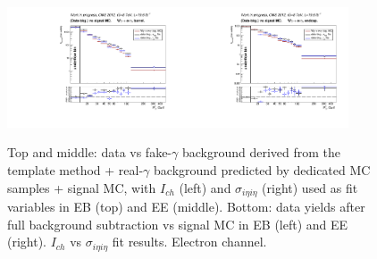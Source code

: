 \begin{figure}[htb]
\begin{center}
\includegraphics[width=0.45\textwidth]{../figs/figs_v11/ELECTRON_WGamma/PrepareYields/c_BkgSubtrDATAvsSIGMC_c_ELECTRON_WGamma__UNblind__Barrel__phoEt.pdf}\includegraphics[width=0.45\textwidth]{../figs/figs_v11/ELECTRON_WGamma/PrepareYields/c_BkgSubtrDATAvsSIGMC_c_ELECTRON_WGamma__UNblind__Endcap__phoEt.pdf}\\
  \caption{Top and middle: data vs fake-$\gamma$ background derived from the template method + real-$\gamma$ background predicted by dedicated MC samples + signal MC, with $I_{ch}$ (left) and $\sigma_{i\eta i\eta}$ (right) used as fit variables in EB (top) and EE (middle). Bottom: data yields after full background subtraction vs signal MC in EB (left) and EE (right). $I_{ch}$ vs $\sigma_{i\eta i\eta}$ fit results. Electron channel.}
  \label{fig:DDvsMC_Wg_Data_ELECTRON}
  \end{center}
\end{figure}

\clearpage

